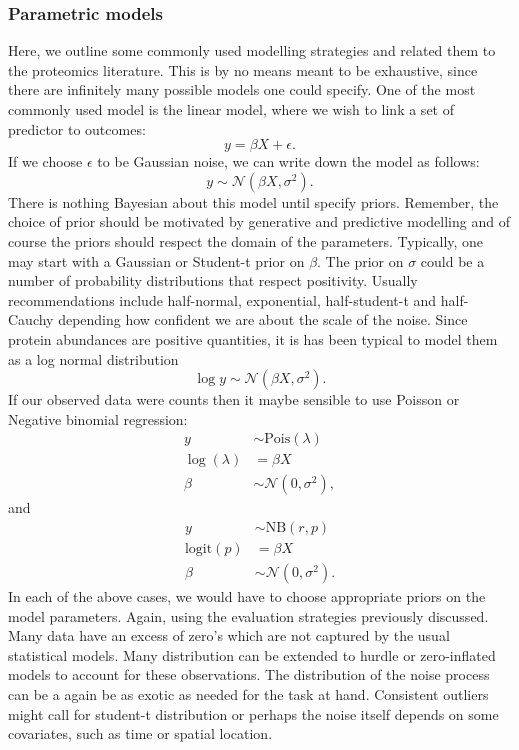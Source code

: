 \documentclass[12pt,english]{article}
\begin{document}
\subsubsection{Parametric models}
Here, we outline some commonly used modelling strategies and related them to the proteomics literature. This is by no means meant to be exhaustive, since there are infinitely many possible models one could specify. One of the most commonly used model is the linear model, where we wish to link a set of predictor to outcomes:
\begin{equation}
y = \beta X + \epsilon.
\end{equation}
If we choose $\epsilon$ to be Gaussian noise, we can write down the model as follows:
\begin{equation}
y \sim \mathcal{N}(\beta X, \sigma^2).
\end{equation}
There is nothing Bayesian about this model until specify priors. Remember, the choice of prior should be motivated by generative and predictive modelling and of course the priors should respect the domain of the parameters. Typically, one may start with a Gaussian or Student-t prior on $\beta$. The prior on $\sigma$ could be a number of probability distributions that respect positivity. Usually recommendations include half-normal, exponential, half-student-t and half-Cauchy depending how confident we are about the scale of the noise. Since protein abundances are positive quantities, it is has been typical to model them as a log normal distribution
\begin{equation}
\log y  \sim \mathcal{N}(\beta X, \sigma^2).
\end{equation}   	
If our observed data were counts then it maybe sensible to use Poisson or Negative binomial regression:
\begin{equation}
\begin{split}
y &\sim \text{Pois}(\lambda)\\
\log(\lambda) &= \beta X\\
\beta &\sim \mathcal{N}(0, \sigma^2),
\end{split}
\end{equation}
and
\begin{equation}
	\begin{split}
		y &\sim \text{NB}(r, p)\\
		\text{logit}(p) &= \beta X\\
		\beta &\sim \mathcal{N}(0, \sigma^2).
	\end{split}
\end{equation}
In each of the above cases, we would have to choose appropriate priors on the model parameters. Again, using the evaluation strategies previously discussed. Many data have an excess of zero's which are not captured by the usual statistical models. Many distribution can be extended to hurdle or zero-inflated models to account for these observations. The distribution of the noise process can be a again be as exotic as needed for the task at hand. Consistent outliers might call for student-t distribution or perhaps the noise itself depends on some covariates, such as time or spatial location.
\end{document}
